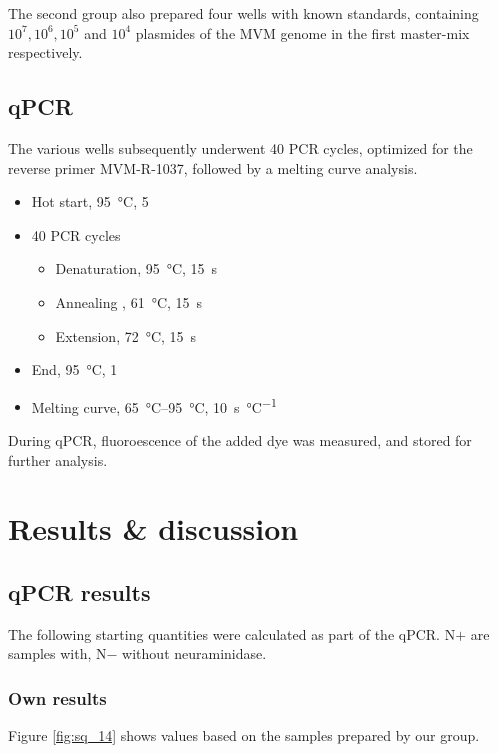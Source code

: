 \documentclass[a4paper,english]{scrreprt}
\begin{document}
The second group also prepared four wells with known standards, containing
$10^7, 10^6, 10^5$ and $10^4$ plasmides of the MVM genome in the first
master-mix respectively.

\section{qPCR}

The various wells subsequently underwent 40 PCR cycles, optimized for the
reverse primer MVM-R-1037, followed by a melting curve analysis.

\begin{itemize}
	\item Hot start, \SI{95}{\celsius}, \SI{5}{\min}
	\item 40 PCR cycles
		\begin{itemize}
			\item Denaturation, \SI{95}{\celsius}, \SI{15}{\s}
			\item Annealing , \SI{61}{\celsius}, \SI{15}{\s}
			\item Extension, \SI{72}{\celsius}, \SI{15}{\s}
		\end{itemize}
	\item End, \SI{95}{\celsius}, \SI{1}{\min}
	\item Melting curve, \SIrange{65}{95}{\celsius}, \SI{10}{\s \per \celsius}
\end{itemize}

During qPCR, fluoroescence of the added dye was measured, and stored for
further analysis.

\chapter{Results \& discussion}

\section{qPCR results}

The following starting quantities were calculated as part of the qPCR. N$+$ are
samples with, N$-$ without neuraminidase.

\subsection{Own results}

Figure \ref{fig:sq_14} shows values based on the samples prepared by our group.
\\
\end{document}
